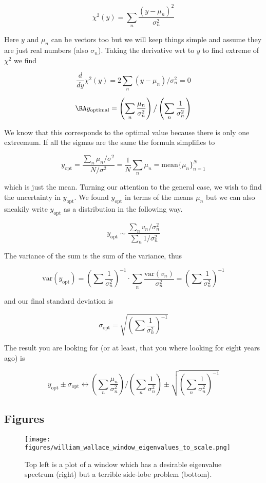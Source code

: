 \documentclass[12pt]{article}
\begin{document}
$$\chi^2(y) = \sum_n \frac{(y-\mu_n)^2}{\sigma_n^2}$$

Here $y$ and $\mu_n$ can be vectors too but we will keep things simple and assume they are just real numbers (also $\sigma_n$). Taking the derivative wrt to $y$ to find extreme of $\chi^2$ we find

$$\frac{d}{dy}\chi^2(y) = 2\sum_n (y - \mu_n) / \sigma_n^2 = 0$$

$$\RA y_{\text{optimal}} = \left( \sum_n \frac{\mu_n}{\sigma_n^2}\right)\big/ \left( \sum_n \frac{1}{\sigma_n^2} \right)$$

We know that this corresponds to the optimal value because there is only one extreemum. If all the sigmas are the same the formula simplifies to 

$$y_{\text{opt}} = \frac{\sum_n \mu_n / \sigma^2}{N/\sigma^2} = \frac{1}{N}\sum_n \mu_n = \text{mean}\{\mu_n\}_{n=1}^N$$

which is just the mean. Turning our attention to the general case, we wish to find the uncertainty in $y_{\text{opt}}$. We found $y_{\text{opt}}$ in terms of the means $\mu_n$ but we can also sneakily write $y_{\text{opt}}$ as a distribution in the following way.

$$y_{\text{opt}} \sim \frac{\sum_n v_n / \sigma_n^2}{\sum_n 1/\sigma_n^2}$$

The variance of the sum is the sum of the variance, thus 

$$\text{var}(y_{\text{opt}}) = \left(\sum\frac{1}{\sigma_n^2}\right)^{-1}\cdot \sum_n \frac{\text{var}(v_n)}{\sigma_n^2} = \left(\sum\frac{1}{\sigma_n^2}\right)^{-1}$$

and our final standard deviation is 

$$\sigma_{\text{opt}} = \sqrt{\left(\sum\frac{1}{\sigma_n^2}\right)^{-1}}$$

The result you are looking for (or at least, that you where looking for eight years ago) is

$$y_{\text{opt}}\pm \sigma_{\text{opt}} \longleftrightarrow \left( \sum_n \frac{\mu_n}{\sigma_n^2}\right)\big/ \left( \sum_n \frac{1}{\sigma_n^2} \right) \pm \sqrt{\left(\sum_n\frac{1}{\sigma_n^2}\right)^{-1}}$$


\subsection{Figures}

\begin{figure}[H]
    \centering
    \texttt{[image: figures/william\_wallace\_window\_eigenvalues\_to\_scale.png]}
    \caption{Top left is a plot of a window which has a desirable eigenvalue spectrum (right) but a terrible side-lobe problem (bottom).}
    \label{fig:william wallace eigenvalues}
\end{figure}
\end{document}
